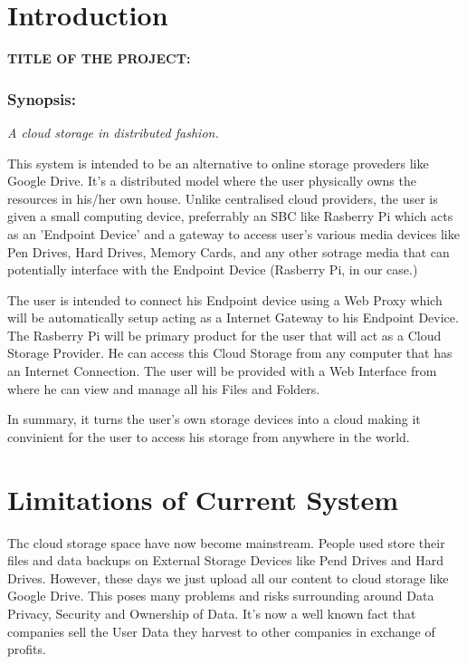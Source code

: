 \documentclass[12pt]{article}
\makeatletter
\let\inserttitle\@title
\makeatother
\begin{document}
\section{Introduction}
\vspace{1cm}
\textbf{\uppercase{Title of the Project:}} \quad\textbf{\MakeUppercase{\inserttitle}}
\bigskip
\subsubsection{Synopsis:} \quad\quad
\textit{A cloud storage in distributed fashion.} \\ \par
This system is intended to be an alternative to online storage proveders like Google Drive. It's a distributed model where the user physically owns the resources in his/her own house. Unlike centralised cloud providers, the user is given a small computing device, preferrably an SBC like Rasberry Pi which acts as an 'Endpoint Device' and a gateway to access user's various media devices like Pen Drives, Hard Drives, Memory Cards, and any other sotrage media that can potentially interface with the Endpoint Device (Rasberry Pi, in our case.) \\ \par
The user is intended to connect his Endpoint device using a Web Proxy which will be automatically setup acting as a Internet Gateway to his Endpoint Device. The Rasberry Pi will be primary product for the user that will act as a Cloud Storage Provider. He can access this Cloud Storage from any computer that has an Internet Connection. The user will be provided with a Web Interface from where he can view and manage all his Files and Folders. \\
\par
In summary, it turns the user's own storage devices into a cloud making it convinient for the user to access his storage from anywhere in the world.


\section{Limitations of Current System}
\vspace{2cm}
\quad\quad Thc cloud storage space have now become mainstream. People used store their files and data backups on External Storage Devices like Pend Drives and Hard Drives. However, these days we just upload all our content to cloud storage like Google Drive. This poses many problems and risks surrounding around Data Privacy, Security and Ownership of Data. It's now a well known fact that companies sell the User Data they harvest to other companies in exchange of profits. \\
\end{document}
